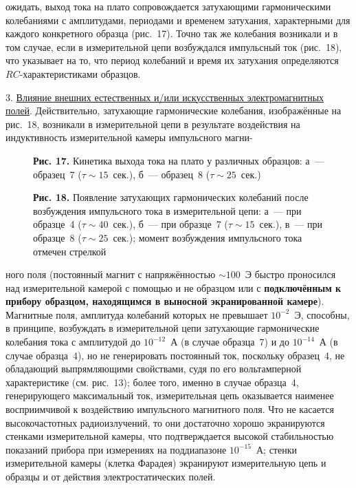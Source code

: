 \documentclass[12pt,a4paper]{article}
\begin{document}
ожидать, выход тока на плато сопровождается затухающими гармоническими
колебаниями с амплитудами, периодами и временем затухания, характерными для
каждого конкретного образца (рис.~17). Точно так же колебания возникали и в
том случае, если в измерительной цепи возбуждался импульсный ток (рис.~18),
что указывает на то, что период колебаний и время их затухания определяются
$RC$-характеристиками образцов.

3. \underline{Влияние внешних естественных и/или искусственных электромагнитных
полей}. Действительно, затухающие гармонические колебания, изображённые на
рис.~18, возникали в измерительной цепи в результате воздействия на
индуктивность измерительной камеры импульсного магни-

\begin{figure}[h]
\centering
\caption*{\textbf{Рис. 17.} Кинетика выхода тока на плато у различных
образцов: а~— образец~7 ($\tau \sim 15$~сек.), б~— образец~8 ($\tau \sim 25$~сек.)}
\end{figure}

\begin{figure}[h]
\centering
\caption*{\textbf{Рис. 18.} Появление затухающих гармонических колебаний после
возбуждения импульсного тока в измерительной цепи: а~— при образце~4
($\tau \sim 40$~сек.), б~— при образце~7 ($\tau \sim 15$~сек.), в~— при
образце~8 ($\tau \sim 25$~сек.); момент возбуждения импульсного тока отмечен
стрелкой}
\end{figure}

\newpage

ного поля (постоянный магнит с напряжённостью $\sim 100$~Э быстро проносился
над измерительной камерой с помощью и не образцом или с \textbf{подключённым
к прибору образцом, находящимся в выносной экранированной камере}). Магнитные
поля, амплитуда колебаний которых не превышает $10^{-2}$~Э, способны, в
принципе, возбуждать в измерительной цепи затухающие гармонические колебания
тока с амплитудой до $10^{-12}$~А (в случае образца~7) и до $10^{-14}$~А (в
случае образца~4), но не генерировать постоянный ток, поскольку образец~4, не
обладающий выпрямляющими свойствами, судя по его вольтамперной характеристике
(см. рис.~13); более того, именно в случае образца~4, генерирующего
максимальный ток, измерительная цепь оказывается наименее восприимчивой к
воздействию импульсного магнитного поля. Что не касается высокочастотных
радиоизлучений, то они достаточно хорошо экранируются стенками измерительной
камеры, что подтверждается высокой стабильностью показаний прибора при
измерениях на поддиапазоне $10^{-15}$~А; стенки измерительной камеры (клетка
Фарадея) экранируют измерительную цепь и образцы и от действия
электростатических полей.
\end{document}
